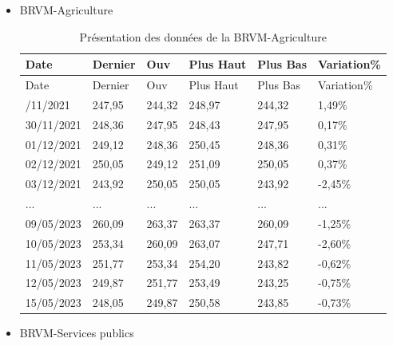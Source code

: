 \begin{itemize}
\item
  BRVM-Agriculture

  \hypertarget{tab:multirow}{}
  \begin{longtable}[]{@{}llllll@{}}
  \caption{Présentation des données de la
  BRVM-Agriculture}\tabularnewline
  \toprule\noalign{}
  Date & Dernier & Ouv & Plus Haut & Plus Bas & Variation\% \\
  \midrule\noalign{}
  \endfirsthead
  \toprule\noalign{}
  Date & Dernier & Ouv & Plus Haut & Plus Bas & Variation\% \\
  \midrule\noalign{}
  \endhead
  \bottomrule\noalign{}
  \endlastfoot
  29/11/2021 & 247,95 & 244,32 & 248,97 & 244,32 & 1,49\% \\
  30/11/2021 & 248,36 & 247,95 & 248,43 & 247,95 & 0,17\% \\
  01/12/2021 & 249,12 & 248,36 & 250,45 & 248,36 & 0,31\% \\
  02/12/2021 & 250,05 & 249,12 & 251,09 & 250,05 & 0,37\% \\
  03/12/2021 & 243,92 & 250,05 & 250,05 & 243,92 & -2,45\% \\
  ... & ... & ... & ... & ... & ... \\
  09/05/2023 & 260,09 & 263,37 & 263,37 & 260,09 & -1,25\% \\
  10/05/2023 & 253,34 & 260,09 & 263,07 & 247,71 & -2,60\% \\
  11/05/2023 & 251,77 & 253,34 & 254,20 & 243,82 & -0,62\% \\
  12/05/2023 & 249,87 & 251,77 & 253,49 & 243,25 & -0,75\% \\
  15/05/2023 & 248,05 & 249,87 & 250,58 & 243,85 & -0,73\% \\
  \end{longtable}
\item
  BRVM-Services publics


\end{itemize}
